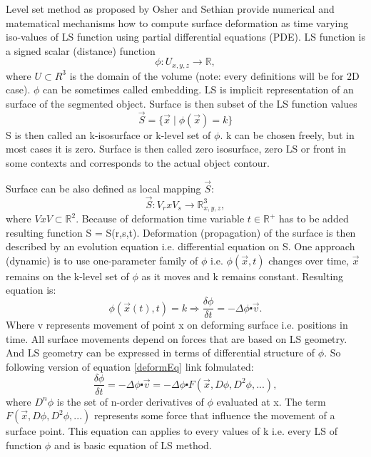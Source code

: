 Level set method as proposed by Osher and Sethian \cite{sethianLS} provide numerical and matematical mechanisms how to compute surface deformation as time varying iso-values of LS function using partial differential equations (PDE). 
LS function is a signed scalar (distance) function 
\begin{equation}
\phi : U_{x,y,z} \rightarrow \mathbb R,
\end{equation}
where $U \subset R^3$ is the domain of the volume (note: every definitions will be for 2D case). $\phi$ can be sometimes called embedding. LS is implicit representation of an surface of the segmented object. Surface is then subset of the LS function values
\begin{equation}
\vec{S} = \{\vec{x}\mid \phi(\vec{x}) = k\}
\end{equation}
S is then called an k-isosurface or k-level set of $\phi$. k can be chosen freely, but in most cases it is zero. Surface is then called zero isosurface, zero LS or front in some contexts and corresponds to the actual object contour. 

Surface can be also defined as local mapping $\vec{S}$:
\begin{equation}
\vec{S}: V_r x V_s \rightarrow \mathbb R^3_{x,y,z},
\end{equation}
where $V x V \subset \mathbb R^2$. Because of deformation time variable $t \in \mathbb R^+$ has to be added resulting function S = S(r,s,t). 
Deformation (propagation) of the surface is then described by an evolution equation i.e. differential equation on S. One approach (dynamic) is to use one-parameter family of $\phi$ i.e. $\phi(\vec{x},t)$ changes over time, $\vec{x}$ remains on the k-level set of $\phi$ as it moves and k remains constant. Resulting equation is:
\begin{equation}
\label{deformEq}
\phi(\vec{x}(t),t) = k \Rightarrow \frac{\delta \phi}{\delta t} = - \Delta \phi \centerdot \vec{v}.
\end{equation}
Where v represents movement of point x on deforming surface i.e. positions in time.
All surface movements depend on forces that are based on LS geometry. And LS geometry can be expressed in terms of differential structure of $\phi$. So following version of equation \ref{deformEq} link folmulated:
\begin{equation}
\frac{\delta\phi}{\delta t} = - \Delta \phi \centerdot \vec{v} = - \Delta \phi \centerdot F(\vec{x}, D\phi, D^2\phi, ...),
\end{equation}
where $D^n\phi$ is the set of n-order derivatives of $\phi$ evaluated at x. The term $F(\vec{x}, D\phi, D^2\phi, ...)$ represents some force that influence the movement of a surface point. This equation can applies to every values of k i.e. every LS of function $\phi$ and is basic equation of LS method.

